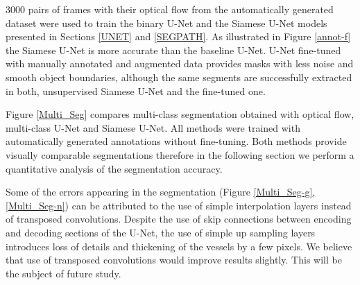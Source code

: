 \documentclass{bmvc2k}
\begin{document}
3000 pairs of frames with their optical flow from the automatically generated dataset were used to train the binary U-Net and the Siamese U-Net models presented in Sections \ref{UNET} and \ref{SEGPATH}. As illustrated in Figure \ref{annot-f} the Siamese U-Net is more accurate than the baseline U-Net. U-Net fine-tuned with manually annotated and augmented data provides masks with less noise and smooth object boundaries, although the same segments are successfully extracted in both, unsupervised Siamese U-Net and the fine-tuned one. 



Figure \ref{Multi_Seg} compares multi-class segmentation obtained with optical flow, multi-class U-Net and Siamese U-Net. All methods were trained with automatically generated annotations without fine-tuning. Both methods provide visually comparable segmentations  therefore in the following section we perform a quantitative analysis of the segmentation accuracy.

Some of the errors appearing in the segmentation (Figure \ref{Multi_Seg-g},\ref{Multi_Seg-n}) can be attributed to the use of  simple interpolation layers instead of transposed convolutions.  Despite the use of skip connections between encoding and decoding sections of the U-Net, the use of simple up sampling layers introduces loss of details and thickening of the vessels by a few pixels. We believe that use of transposed convolutions would improve results slightly. This will be the subject of future study.
\end{document}
